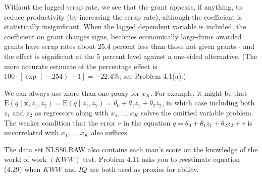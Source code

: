 \documentclass[10pt]{article}
\begin{document}
Without the lagged scrap rate, we see that the grant appears, if anything, to reduce productivity (by increasing the scrap rate), although the coefficient is statistically insignificant. When the lagged dependent variable is included, the coefficient on grant changes signs, becomes economically large-firms awarded grants have scrap rates about 25.4 percent less than those not given grants - and the effect is significant at the 5 percent level against a one-sided alternative. (The more accurate estimate of the percentage effect is $100 \cdot[\exp (-.254)-1]=-22.4 \%$; see Problem 4.1(a).)

We can always use more than one proxy for $x_{K}$. For example, it might be that $\mathrm{E}\left(q \mid \mathbf{x}, z_{1}, z_{2}\right)=\mathrm{E}\left(q \mid z_{1}, z_{2}\right)=\theta_{0}+\theta_{1} z_{1}+\theta_{2} z_{2}$, in which case including both $z_{1}$ and $z_{2}$ as regressors along with $x_{1}, \ldots, x_{K}$ solves the omitted variable problem. The weaker condition that the error $r$ in the equation $q=\theta_{0}+\theta_{1} z_{1}+\theta_{2} z_{2}+r$ is uncorrelated with $x_{1}, \ldots, x_{K}$ also suffices.

The data set NLS80.RAW also contains each man's score on the knowledge of the world of work $(K W W)$ test. Problem 4.11 asks you to reestimate equation (4.29) when $K W W$ and $I Q$ are both used as proxies for ability.
\end{document}
